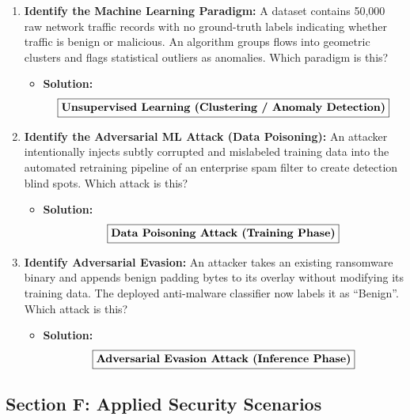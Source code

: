 \begin{enumerate}[label=\textbf{Problem \arabic*.,resume},leftmargin=1.5cm]
\item \textbf{Identify the Machine Learning Paradigm:}
A dataset contains 50,000 raw network traffic records with no ground-truth labels indicating whether traffic is benign or malicious. An algorithm groups flows into geometric clusters and flags statistical outliers as anomalies. Which paradigm is this?
\begin{itemize}
\item \textbf{Solution:}
\[ \boxed{\text{\textbf{Unsupervised Learning (Clustering / Anomaly Detection)}}} \]
\end{itemize}

\item \textbf{Identify the Adversarial ML Attack (Data Poisoning):}
An attacker intentionally injects subtly corrupted and mislabeled training data into the automated retraining pipeline of an enterprise spam filter to create detection blind spots. Which attack is this?
\begin{itemize}
\item \textbf{Solution:}
\[ \boxed{\text{\textbf{Data Poisoning Attack (Training Phase)}}} \]
\end{itemize}

\item \textbf{Identify Adversarial Evasion:}
An attacker takes an existing ransomware binary and appends benign padding bytes to its overlay without modifying its training data. The deployed anti-malware classifier now labels it as ``Benign''. Which attack is this?
\begin{itemize}
\item \textbf{Solution:}
\[ \boxed{\text{\textbf{Adversarial Evasion Attack (Inference Phase)}}} \]
\end{itemize}
\end{enumerate}

\subsection{Section F: Applied Security Scenarios}

